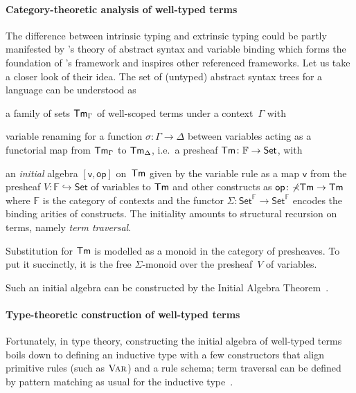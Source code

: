 \documentclass[BiSig.tex]{subfiles}
\begin{document}
\paragraph{Category-theoretic analysis of well-typed terms}
The difference between intrinsic typing and extrinsic typing could be partly manifested by \citet{Fiore1999}{'s} theory of abstract syntax and variable binding which forms the foundation of \citet{Fiore2022}'s framework and inspires other referenced frameworks.
Let us take a closer look of their idea.
The set of (untyped) abstract syntax trees for a language can be understood as
\begin{enumerate*}
  \item a family of sets $\mathsf{Tm}_{\Gamma}$ of well-scoped terms under a context~$\Gamma$ with
  \item variable renaming for a function $\sigma\colon \Gamma \to \Delta$ between variables acting as a functorial map from $\mathsf{Tm}_{\Gamma}$ to $\mathsf{Tm}_{\Delta}$, i.e.\ a presheaf $\mathsf{Tm}\colon \mathbb{F} \to \mathsf{Set}$, with
  \item an \emph{initial} algebra $[\mathsf{v}, \mathsf{op}]$ on~$\mathsf{Tm}$ given by the variable rule as a map $\mathsf{v}$ from the presheaf $V\colon \mathbb{F} \hookrightarrow \mathsf{Set}$ of variables to $\mathsf{Tm}$ and other constructs as $\mathsf{op}\colon \mathbb{\Sigma}\mathsf{Tm} \to \mathsf{Tm}$ where $\mathbb{F}$ is the category of contexts and the functor $\mathbb{\Sigma}\colon \mathsf{Set}^\mathbb{F} \to \mathsf{Set}^\mathbb{F}$ encodes the binding arities of constructs. 
  The initiality amounts to structural recursion on terms, namely \emph{term traversal}.
\end{enumerate*}
Substitution for $\mathsf{Tm}$ is modelled as a monoid in the category of presheaves.
To put it succinctly, it is the free $\mathbb{\Sigma}$-monoid over the presheaf~$V$ of variables.

Such an initial algebra can be constructed by the Initial Algebra Theorem~\cite{Trnkova1975}.

\paragraph{Type-theoretic construction of well-typed terms}
Fortunately, in type theory, constructing the initial algebra of well-typed terms boils down to defining an inductive type with a few constructors that align primitive rules (such as $\textnormal{\textsc{Var}}$) and a rule schema; term traversal can be defined by pattern matching as usual for the inductive type~\citep{Fiore2022}.
\end{document}
